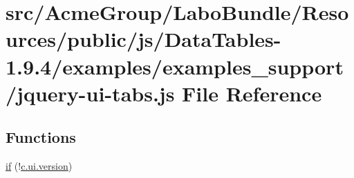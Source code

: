 \hypertarget{jquery-ui-tabs_8js}{\section{src/\+Acme\+Group/\+Labo\+Bundle/\+Resources/public/js/\+Data\+Tables-\/1.9.4/examples/examples\+\_\+support/jquery-\/ui-\/tabs.js File Reference}
\label{jquery-ui-tabs_8js}
}
\subsection*{Functions}
\begin{DoxyCompactItemize}
\item 
\hyperlink{jquery-ui-tabs_8js_ad79dc947a6d79775d004aec8babd5dad}{if} (!\hyperlink{jquery-ui_8js_a8fa514f3aed7ddc8bfb00ed5aea5b5e2}{c.\+ui.\+version})
\item 

\end{DoxyCompactItemize}
